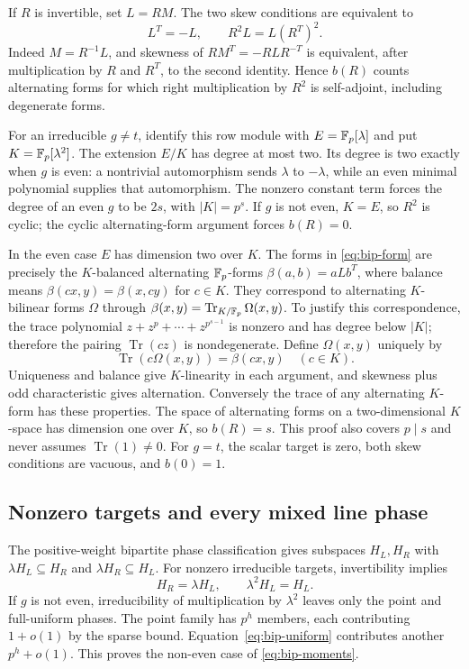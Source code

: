 If $R$ is invertible, set $L=RM$. The two skew conditions are
equivalent to
\begin{equation}\label{eq:bip-form}
 L^T=-L,\qquad R^2L=L(R^T)^2.
\end{equation}
Indeed $M=R^{-1}L$, and skewness of $RM^T=-RL R^{-T}$ is
equivalent, after multiplication by $R$ and $R^T$, to the second
identity. Hence $b(R)$ counts alternating forms for which right
multiplication by $R^2$ is self-adjoint, including degenerate forms.

For an irreducible $g\ne t$, identify this row module with
$E=\mathbb F_p[\lambda]$ and put $K=\mathbb F_p[\lambda^2]$.
The extension $E/K$ has degree at most two. Its degree is two
exactly when $g$ is even: a nontrivial automorphism sends
$\lambda$ to $-\lambda$, while an even minimal polynomial supplies
that automorphism. The nonzero constant term forces the degree of
an even $g$ to be $2s$, with $|K|=p^s$.
If $g$ is not even, $K=E$, so $R^2$ is cyclic; the cyclic
alternating-form argument forces $b(R)=0$.

In the even case $E$ has dimension two over $K$.
The forms in \eqref{eq:bip-form} are precisely the $K$-balanced
alternating $\mathbb F_p$-forms $\beta(a,b)=aLb^T$, where balance means
$\beta(cx,y)=\beta(x,cy)$ for $c\in K$.
They correspond to alternating $K$-bilinear
forms $\Omega$ through $\beta(x,y)=\operatorname{Tr}_{K/\mathbb F_p}\Omega(x,y)$.
To justify this correspondence, the trace polynomial
$z+z^p+\cdots+z^{p^{s-1}}$ is nonzero and has degree below $|K|$;
therefore the pairing $\operatorname{Tr}(cz)$ is nondegenerate.
Define $\Omega(x,y)$ uniquely by
\[
 \operatorname{Tr}(c\Omega(x,y))=\beta(cx,y)\quad(c\in K).
\]
Uniqueness and balance give $K$-linearity in each argument, and
skewness plus odd characteristic gives alternation. Conversely the
trace of any alternating $K$-form has these properties. The space
of alternating forms on a two-dimensional $K$-space has dimension
one over $K$, so $b(R)=s$. This proof also covers $p\mid s$ and
never assumes $\operatorname{Tr}(1)\ne0$.
For $g=t$, the scalar target is zero, both skew conditions are
vacuous, and $b(0)=1$.

\subsection{Nonzero targets and every mixed line phase}
The positive-weight bipartite phase classification
gives subspaces $H_L,H_R$ with
$\lambda H_L\subseteq H_R$ and $\lambda H_R\subseteq H_L$.
For nonzero irreducible targets, invertibility implies
\[
 H_R=\lambda H_L,\qquad \lambda^2H_L=H_L.
\]
If $g$ is not even, irreducibility of multiplication by $\lambda^2$
leaves only the point and full-uniform phases. The point family
has $p^h$ members, each contributing $1+o(1)$ by the sparse bound.
Equation~\eqref{eq:bip-uniform} contributes another $p^h+o(1)$.
This proves the non-even case of \eqref{eq:bip-moments}.

